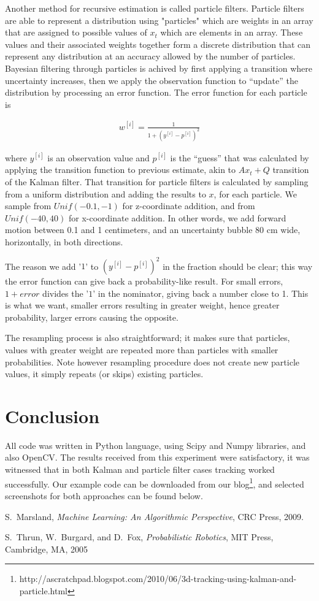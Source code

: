 \documentclass[11pt]{article}
\begin{document}
Another method for recursive estimation is called particle filters. Particle
filters are able to represent a distribution using "particles" which are weights
in an array that are assigned to possible values of $x_t$ which are elements in
an array. These values and their associated weights together form a discrete
distribution that can represent any distribution at an accuracy allowed by the
number of particles. Bayesian filtering through particles is achived by first
applying a transition where uncertainty increases, then we apply the observation
function to ``update'' the distribution by processing an error function. The
error function for each particle is

\begin{eqnarray*}
w^{[i]}=\frac{1}{1 + (y^{[i]}-p^{[i]})^2}
\end{eqnarray*}

where $y^{[i]}$ is an observation value and $p^{[i]}$ is the ``guess'' that was
calculated by applying the transition function to previous estimate, akin to
$Ax_t + Q$ transition of the Kalman filter. That transition for particle filters
is calculated by sampling from a uniform distribution and adding the results to
$x$, for each particle. We sample from $Unif(-0.1, -1)$ for z-coordinate
addition, and from $Unif(-40,40)$ for x-coordinate addition. In other words, we
add forward motion between 0.1 and 1 centimeters, and an uncertainty bubble 80
cm wide, horizontally, in both directions. 

The reason we add '$1$' to $(y^{[i]}-p^{[i]})^2$ in the fraction should be
clear; this way the error function can give back a probability-like result. For
small errors, $1+error$ divides the '$1$' in the nominator, giving back a number
close to 1. This is what we want, smaller errors resulting in greater weight,
hence greater probability, larger errors causing the opposite.

The resampling process is also straightforward; it makes sure that particles,
values with greater weight are repeated more than particles with smaller
probabilities. Note however resampling procedure does not create new particle
values, it simply repeats (or skips) existing particles.

\section{Conclusion}

All code was written in Python language, using Scipy and Numpy libraries, and
also OpenCV. The results received from this experiment were satisfactory, it was
witnessed that in both Kalman and particle filter cases tracking worked
successfully. Our example code can be downloaded from our
blog\footnote{http://ascratchpad.blogspot.com/2010/06/3d-tracking-using-kalman-and-particle.html},
and selected screenshots for both approaches can be found below.

\begin{thebibliography}{1}

S.~Marsland, \emph{Machine Learning: An Algorithmic Perspective}, CRC Press, 2009.

S.~Thrun, W.~Burgard, and D.~Fox, \emph{Probabilistic Robotics}, MIT Press, Cambridge, MA, 2005

\end{thebibliography}
\end{document}
